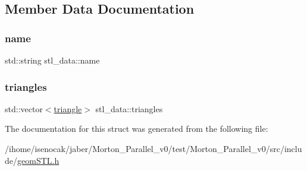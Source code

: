 \subsection{Member Data Documentation}
\mbox{\label{structstl__data_ab7c4953a186ecd969ceabd312b84c27d}} 
\subsubsection{\texorpdfstring{name}{name}}
{\footnotesize\ttfamily std\+::string stl\+\_\+data\+::name}

\mbox{\label{structstl__data_acd94c025a7af5a9c8eaabd40db263b25}} 
\subsubsection{\texorpdfstring{triangles}{triangles}}
{\footnotesize\ttfamily std\+::vector$<$\mbox{\hyperlink{structtriangle}{triangle}}$>$ stl\+\_\+data\+::triangles}



The documentation for this struct was generated from the following file\+:\begin{DoxyCompactItemize}
\item 
/ihome/isenocak/jaber/\+Morton\+\_\+\+Parallel\+\_\+v0/test/\+Morton\+\_\+\+Parallel\+\_\+v0/src/include/\mbox{\hyperlink{geomSTL_8h}{geom\+S\+T\+L.\+h}}\end{DoxyCompactItemize}

